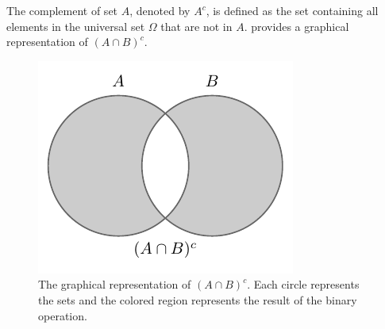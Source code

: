 \begin{definition}[Complementation]
	The complement of set $A$, denoted by $A^c$, is defined as the set containing all elements in the universal set $\Omega$ that are not in $A$.  provides a graphical representation of $(A \cap B)^c$.
	\begin{figure}[H]
		\centering
		\includegraphics[]{figures/set_complementary.pdf}
		\caption{The graphical representation of $(A \cap B)^c$. Each circle represents the sets and the colored region represents the result of the binary operation.}
		\label{fig:set_complementation}
	\end{figure}
\end{definition}

